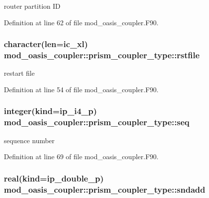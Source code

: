 router partition I\+D 



Definition at line 62 of file mod\+\_\+oasis\+\_\+coupler.\+F90.

\hypertarget{structmod__oasis__coupler_1_1prism__coupler__type_a8a660e192210d1e8ff71f7dded631dce}{
\subsubsection[{rstfile}]{\setlength{\rightskip}{0pt plus 5cm}character(len=ic\+\_\+xl) mod\+\_\+oasis\+\_\+coupler\+::prism\+\_\+coupler\+\_\+type\+::rstfile\hspace{0.3cm}{\ttfamily [private]}}}\label{structmod__oasis__coupler_1_1prism__coupler__type_a8a660e192210d1e8ff71f7dded631dce}


restart file 



Definition at line 54 of file mod\+\_\+oasis\+\_\+coupler.\+F90.

\hypertarget{structmod__oasis__coupler_1_1prism__coupler__type_af1766ab1d9fe55670c551a9d0c7f2e00}{
\subsubsection[{seq}]{\setlength{\rightskip}{0pt plus 5cm}integer(kind=ip\+\_\+i4\+\_\+p) mod\+\_\+oasis\+\_\+coupler\+::prism\+\_\+coupler\+\_\+type\+::seq\hspace{0.3cm}{\ttfamily [private]}}}\label{structmod__oasis__coupler_1_1prism__coupler__type_af1766ab1d9fe55670c551a9d0c7f2e00}


sequence number 



Definition at line 69 of file mod\+\_\+oasis\+\_\+coupler.\+F90.

\hypertarget{structmod__oasis__coupler_1_1prism__coupler__type_ad0176e1d6bdcb0f50fc5889921aec8dc}{
\subsubsection[{sndadd}]{\setlength{\rightskip}{0pt plus 5cm}real(kind=ip\+\_\+double\+\_\+p) mod\+\_\+oasis\+\_\+coupler\+::prism\+\_\+coupler\+\_\+type\+::sndadd\hspace{0.3cm}{\ttfamily [private]}}}\label{structmod__oasis__coupler_1_1prism__coupler__type_ad0176e1d6bdcb0f50fc5889921aec8dc}


